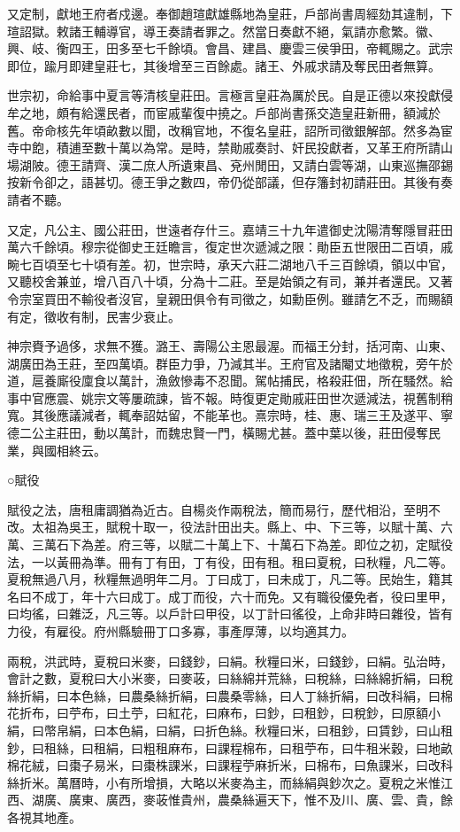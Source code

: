 又定制，獻地王府者戍邊。奉御趙瑄獻雄縣地為皇莊，戶部尚書周經劾其違制，下瑄詔獄。敕諸王輔導官，導王奏請者罪之。然當日奏獻不絕，氣請亦愈繁。徽、興、岐、衡四王，田多至七千餘頃。會昌、建昌、慶雲三侯爭田，帝輒賜之。武宗即位，踰月即建皇莊七，其後增至三百餘處。諸王、外戚求請及奪民田者無算。

世宗初，命給事中夏言等清核皇莊田。言極言皇莊為厲於民。自是正德以來投獻侵牟之地，頗有給還民者，而宦戚輩復中撓之。戶部尚書孫交造皇莊新冊，額減於舊。帝命核先年頃畝數以聞，改稱官地，不復名皇莊，詔所司徵銀解部。然多為宦寺中飽，積逋至數十萬以為常。是時，禁勛戚奏討、奸民投獻者，又革王府所請山場湖陂。德王請齊、漢二庶人所遺東昌、兗州閒田，又請白雲等湖，山東巡撫邵錫按新令卻之，語甚切。德王爭之數四，帝仍從部議，但存籓封初請莊田。其後有奏請者不聽。

又定，凡公主、國公莊田，世遠者存什三。嘉靖三十九年遣御史沈陽清奪隱冒莊田萬六千餘頃。穆宗從御史王廷瞻言，復定世次遞減之限：勛臣五世限田二百頃，戚畹七百頃至七十頃有差。初，世宗時，承天六莊二湖地八千三百餘頃，領以中官，又聽校舍兼並，增八百八十頃，分為十二莊。至是始領之有司，兼并者還民。又著令宗室買田不輸役者沒官，皇親田俱令有司徵之，如勳臣例。雖請乞不乏，而賜額有定，徵收有制，民害少衰止。

神宗賚予過侈，求無不獲。潞王、壽陽公主恩最渥。而福王分封，括河南、山東、湖廣田為王莊，至四萬頃。群臣力爭，乃減其半。王府官及諸閹丈地徵稅，旁午於道，扈養廝役廩食以萬計，漁斂慘毒不忍聞。駕帖捕民，格殺莊佃，所在騷然。給事中官應震、姚宗文等屢疏諫，皆不報。時復更定勛戚莊田世次遞減法，視舊制稍寬。其後應議減者，輒奉詔姑留，不能革也。熹宗時，桂、惠、瑞三王及遂平、寧德二公主莊田，動以萬計，而魏忠賢一門，橫賜尤甚。蓋中葉以後，莊田侵奪民業，與國相終云。


○賦役

賦役之法，唐租庸調猶為近古。自楊炎作兩稅法，簡而易行，歷代相沿，至明不改。太祖為吳王，賦稅十取一，役法計田出夫。縣上、中、下三等，以賦十萬、六萬、三萬石下為差。府三等，以賦二十萬上下、十萬石下為差。即位之初，定賦役法，一以黃冊為準。冊有丁有田，丁有役，田有租。租曰夏稅，曰秋糧，凡二等。夏稅無過八月，秋糧無過明年二月。丁曰成丁，曰未成丁，凡二等。民始生，籍其名曰不成丁，年十六曰成丁。成丁而役，六十而免。又有職役優免者，役曰里甲，曰均徭，曰雜泛，凡三等。以戶計曰甲役，以丁計曰徭役，上命非時曰雜役，皆有力役，有雇役。府州縣驗冊丁口多寡，事產厚薄，以均適其力。

兩稅，洪武時，夏稅曰米麥，曰錢鈔，曰絹。秋糧曰米，曰錢鈔，曰絹。弘治時，會計之數，夏稅曰大小米麥，曰麥荍，曰絲綿并荒絲，曰稅絲，曰絲綿折絹，曰稅絲折絹，曰本色絲，曰農桑絲折絹，曰農桑零絲，曰人丁絲折絹，曰改科絹，曰棉花折布，曰苧布，曰土苧，曰紅花，曰麻布，曰鈔，曰租鈔，曰稅鈔，曰原額小絹，曰幣帛絹，曰本色絹，曰絹，曰折色絲。秋糧曰米，曰租鈔，曰賃鈔，曰山租鈔，曰租絲，曰租絹，曰粗租麻布，曰課程棉布，曰租苧布，曰牛租米穀，曰地畝棉花絨，曰棗子易米，曰棗株課米，曰課程苧麻折米，曰棉布，曰魚課米，曰改科絲折米。萬曆時，小有所增損，大略以米麥為主，而絲絹與鈔次之。夏稅之米惟江西、湖廣、廣東、廣西，麥荍惟貴州，農桑絲遍天下，惟不及川、廣、雲、貴，餘各視其地產。


